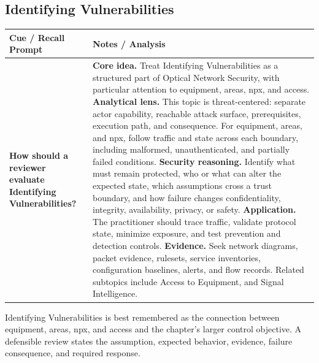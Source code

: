 \documentclass[11pt]{article}
\newcommand{\CornellHeader}{%
\rowcolor{Navy}\color{white}\bfseries Cue / Recall Prompt & \color{white}\bfseries Notes / Analysis\\\hline}
\newcommand{\CornellRow}[2]{%
\cellcolor{CueGray}\RaggedRight\textbf{#1} & \RaggedRight #2\\\hline}
\begin{document}
\subsection*{Identifying Vulnerabilities}
\begin{longtable}{>{\RaggedRight\arraybackslash}p{}|>{\RaggedRight\arraybackslash}p{}}
\CornellHeader
\CornellRow{How should a reviewer evaluate Identifying Vulnerabilities?}{\textbf{Core idea.} Treat Identifying Vulnerabilities as a structured part of Optical Network Security, with particular attention to equipment, areas, npx, and access. \textbf{Analytical lens.} This topic is threat-centered: separate actor capability, reachable attack surface, prerequisites, execution path, and consequence. For equipment, areas, and npx, follow traffic and state across each boundary, including malformed, unauthenticated, and partially failed conditions. \textbf{Security reasoning.} Identify what must remain protected, who or what can alter the expected state, which assumptions cross a trust boundary, and how failure changes confidentiality, integrity, availability, privacy, or safety. \textbf{Application.} The practitioner should trace traffic, validate protocol state, minimize exposure, and test prevention and detection controls. \textbf{Evidence.} Seek network diagrams, packet evidence, rulesets, service inventories, configuration baselines, alerts, and flow records. Related subtopics include Access to Equipment, and Signal Intelligence.}
\end{longtable}
\begin{topicsummary}
Identifying Vulnerabilities is best remembered as the connection between equipment, areas, npx, and access and the chapter's larger control objective. A defensible review states the assumption, expected behavior, evidence, failure consequence, and required response.
\end{topicsummary}
\end{document}
